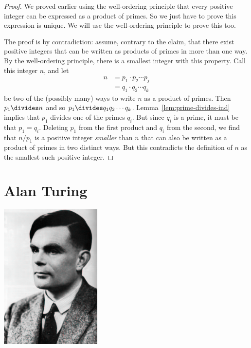 \begin{proof}
We proved earlier using the well-ordering principle that every positive
integer can be expressed as a product of primes.  So we just have to prove
this expression is unique.  We will use the well-ordering principle to
prove this too.

The proof is by contradiction: assume, contrary to the claim, that there
exist positive integers that can be written as products of primes in more
than one way.  By the well-ordering principle, there is a smallest integer
with this property.  Call this integer $n$, and let
%
\begin{align*}
n & = p_1 \cdot p_2 \cdots p_j \\
  & = q_1 \cdot q_2 \cdots q_k
\end{align*}
%
be two of the (possibly many) ways to write $n$ as a product of
primes.  Then $p_1 \divides n$ and so $p_1 \divides q_1 q_2 \cdots q_k$.
Lemma~\ref{lem:prime-divides-ind} implies that $p_1$ divides one of
the primes $q_i$.  But since $q_i$ is a prime, it must be that $p_1 =
q_i$.  Deleting $p_1$ from the first product and $q_i$ from the
second, we find that $n / p_1$ is a positive integer \emph{smaller}
than $n$ that can also be written as a product of primes in two
distinct ways.  But this contradicts the definition of $n$ as the
smallest such positive integer.
\end{proof}

{}


\section{Alan Turing}

\centerline{\includegraphics[width=2in]{figures/turing.pdf}}

